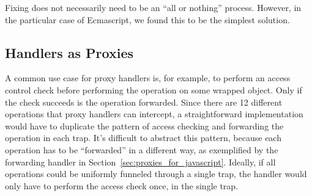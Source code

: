\documentclass{acm_proc_article-sp}
\begin{document}
Fixing does not necessarily need to be an ``all or nothing'' process. However, in the particular case of Ecmascript, we found this to be the simplest solution.


%
%
%

\subsection{Handlers as Proxies}
\label{sub:doublelifting}

A common use case for proxy handlers is, for example, to perform an access control check before performing the operation on some wrapped object. Only if the check succeeds is the operation forwarded. Since there are 12 different operations that proxy handlers can intercept, a straightforward implementation would have to duplicate the pattern of access checking and forwarding the operation in each trap. It's difficult to abstract this pattern, because each operation has to be ``forwarded'' in a different way, as exemplified by the forwarding handler in Section~\ref{sec:proxies_for_javascript}. Ideally, if all operations could be uniformly funneled through a single trap, the handler would only have to perform the access check once, in the single trap.
\end{document}
